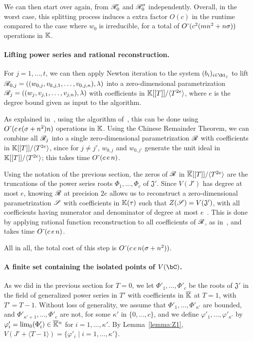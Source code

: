 \documentclass[12pt]{article}
\begin{document}
We can then start over again, from $\mathscr{R}'_0$ and $\mathscr{R}''_0$
independently. Overall, in the worst case, this splitting process
induces a extra factor $O(c)$ in the runtime compared to the case
where $w_0$ is irreducible, for a total of ${O}{\,\tilde{ }\,}( c^2 (mn^2 + n\sigma) )$
operations in $\mathbb{K}$.

\paragraph{Lifting power series and rational reconstruction.}
For $j=1,\dots,t$, we can then apply Newton iteration to the system
$(b_i)_{i \in \bi_j}$ to lift
$\mathscr{R}_{0,j}=((w_{0,j},v_{0,j,1},\dots,v_{0,j,n}),\lambda)$ into a
zero-dimensional parametrization
$\mathscr{R}_{j}=((w_{j},v_{j,1},\dots,v_{j,n}),\lambda)$ with coefficients
in $\mathbb{K}[[T]]/\langle T^{2e}\rangle$, where $e$ is the degree bound given
as input to the algorithm.

As explained in~\cite[Section~2.2]{SaSc16}, using the algorithm
of~\cite{GiLeSa01}, this can be done using ${O}{\,\tilde{ }\,}(c\,e (\sigma+n^2)n)$
operations in $\mathbb{K}$.  Using the Chinese Remainder Theorem, we can
combine all $\mathscr{R}_{j}$ into a single zero-dimensional parametrization
$\mathscr{R}$ with coefficients in $\mathbb{K}[[T]]/\langle T^{2e}\rangle$, since
for $j\ne j'$, $w_{0,j}$ and $w_{0,j'}$ generate the unit ideal in
$\mathbb{K}[[T]]/\langle T^{2e}\rangle$; this takes time 
${O}{\,\tilde{ }\,}(c\,e\,n)$.

Using the notation of the previous section, the zeros of $\mathscr{R}$ in
$\overline{\mathbb{K}}[[T]]/\langle T^{2e}\rangle$ are the truncations of the power
series roots $\Phi_1,\dots,\Phi_c$ of $\mathfrak{J}'$. Since $V(J')$ has
degree at most $e$, knowing $\mathscr{R}$ at precision $2e$ allows us to
reconstruct a zero-dimensional parametrization $\mathscr{S}$ with
coefficients in $\mathbb{K}(\tau)$ such that $Z(\mathscr{S})=V(\mathfrak{J}')$,
with all coefficients having numerator and denominator of degree at
most $e$~\cite[Theorem~1]{Schost03}.  This is done by applying
rational function reconstruction to all coefficients of $\mathscr{R}$, as
in~\cite{Schost03}, and takes time ${O}{\,\tilde{ }\,}(c\,e\,n)$.

All in all, the total cost of this step is ${O}{\,\tilde{ }\,}(c\,e\,n (\sigma+n^2))$.

\paragraph{A finite set containing the isolated points of $V(\bC)$.}
As we did in the previous section for $T=0$, we let
$\Phi'_1,\dots,\Phi'_c$ be the roots of $\mathfrak{J}'$ in the field
of generalized power series in $T'$ with coefficients in $\overline{\mathbb{K}}$ at
$T=1$, with $T'=T-1$. Without loss of generality, we assume that
$\Phi'_1,\dots,\Phi'_{\kappa'}$ are bounded, and
$\Phi'_{\kappa'+1},\dots,\Phi'_c$ are not, for some $\kappa'$ in
$\{0,\dots,c\}$, and we define $\varphi'_1,\dots,\varphi'_{\kappa'}$
by $\varphi'_i=\lim_0(\Phi'_i)\in\overline{\mathbb{K}}{}^n$ for $i=1,\dots,\kappa'$.
By Lemma~\ref{lemma:Z1},
$V(J' + \langle T-1\rangle) = \{ \varphi'_i \mid i=1,\dots,\kappa'\}$.
\end{document}
